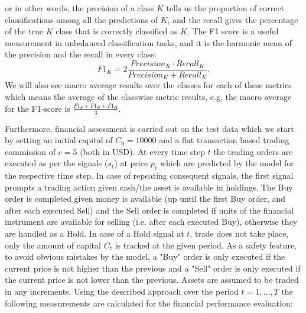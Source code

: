 \documentclass[11pt, a4paper]{article}
\begin{document}
or in other words, the precision of a class $K$ tells us the proportion of correct classifications among all the predictions of $K$, and the recall gives the percentage of the true $K$ class that is correctly classified as $K$. The F1 score is a useful measurement in unbalanced classification tasks, and it is the harmonic mean of the precision and the recall in every class:
\begin{equation}
    \label{eq:f1}
    F1_K = 2 \frac{Precision_K \cdot Recall_K}{Precision_K + Recall_K}.
\end{equation}
We will also see macro average results over the classes for each of these metrics which means the average of the classwise metric results, e.g. the macro average for the F1-score is $\frac{F1_S + F1_B + F1_H}{3}$.

Furthermore, financial assessment is carried out on the test data which we start by setting an initial capital of $C_0 = 10000$ and a flat transaction based trading commission of $c = 5$ (both in USD). At every time step $t$ the trading orders are executed as per the signals ($s_t$) at price $p_t$ which are predicted by the model for the respective time step.
In case of repeating consequent signals, the first signal prompts a trading action given cash/the asset is available in holdings. The Buy order is completed given money is available (up until the first Buy order, and after each executed Sell) and the Sell order is completed if units of the financial instrument are available for selling (i.e. after each executed Buy), otherwise they are handled as a Hold. In case of a Hold signal at $t$, trade does not take place, only the amount of capital $C_t$ is tracked at the given period. As a safety feature, to avoid obvious mistakes by the model, a "Buy" order is only executed if the current price is not higher than the previous and a "Sell" order is only executed if the current price is not lower than the previous.
Assets are assumed to be traded in any increments. Using the described approach over the period $t=1, \dots, T$ the following measurements are calculated for the financial performance evaluation:
\end{document}
